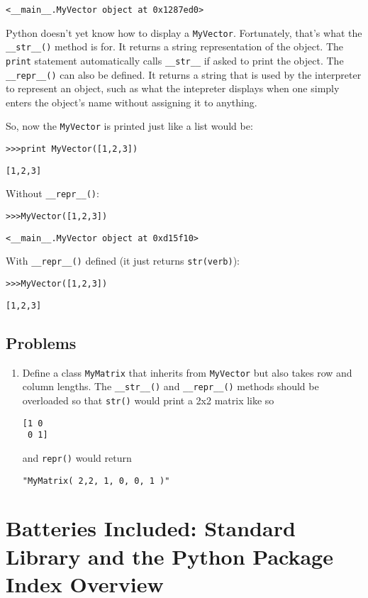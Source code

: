 \verb|<__main__.MyVector object at 0x1287ed0>|

Python doesn't yet know how to display a \verb|MyVector|. Fortunately, that's what the \verb|__str__()| method is for. It returns a string representation of the object. The \verb|print| statement automatically calls \verb|__str__| if asked to print the object. The \verb|__repr__()| can also be defined. It returns a string that is used by the interpreter to represent an object, such as what the intepreter displays when one simply enters the object's name without assigning it to anything.



So, now the \verb|MyVector| is printed just like a list would be:

\verb|>>>print MyVector([1,2,3])|

\verb|[1,2,3]|

Without \verb|__repr__()|:

\verb|>>>MyVector([1,2,3])|

\verb|<__main__.MyVector object at 0xd15f10>|

With \verb|__repr__()| defined (it just returns \verb|str(verb)|):

\verb|>>>MyVector([1,2,3])|

\verb|[1,2,3]|

\subsection{Problems}

\begin{enumerate}

	\item Define a class \verb|MyMatrix| that inherits from \verb|MyVector| but also takes row and column lengths. The \verb|__str__()| and \verb|__repr__()| methods should be overloaded so that \verb|str()| would print a 2x2 matrix like so

\begin{verbatim}
[1 0
 0 1]
\end{verbatim}

and \verb|repr()| would return

\verb|"MyMatrix( 2,2, 1, 0, 0, 1 )"|

\end{enumerate}

\section{ Batteries Included: Standard Library and the Python Package Index Overview}

